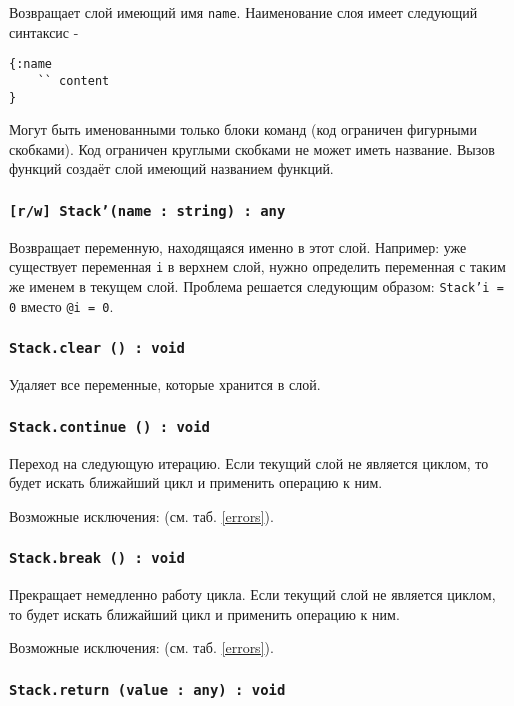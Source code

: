 Возвращает слой имеющий имя \texttt{name}. Наименование слоя имеет следующий синтаксис -
\begin{verbatim}
{:name
	`` content
}
\end{verbatim}
Могут быть именованными только блоки команд (код ограничен фигурными скобками). Код ограничен круглыми скобками не может иметь название. Вызов функций создаёт слой имеющий названием функций.

\subsubsection{\texttt{[r/w] Stack'(name : string) : any}}

Возвращает переменную, находящаяся именно в этот слой. Например: уже существует переменная \texttt{i} в верхнем слой, нужно определить переменная с таким же именем в текущем слой. Проблема решается следующим образом: \texttt{Stack'i = 0} вместо \texttt{@i = 0}.

\subsubsection{\texttt{Stack.clear () : void}}

Удаляет все переменные, которые хранится в слой.

\subsubsection{\texttt{Stack.continue () : void}}

Переход на следующую итерацию. Если текущий слой не является циклом, то будет искать ближайший цикл и применить операцию к ним.

Возможные исключения:  (см. таб. \ref{errors}).

\subsubsection{\texttt{Stack.break () : void}}

Прекращает немедленно работу цикла. Если текущий слой не является циклом, то будет искать ближайший цикл и применить операцию к ним.

Возможные исключения:  (см. таб. \ref{errors}).

\subsubsection{\texttt{Stack.return (value : any) : void}}

